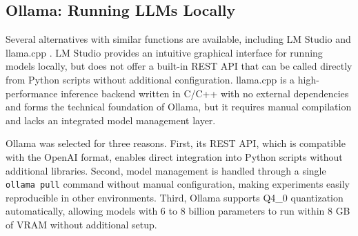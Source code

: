\subsection{Ollama: Running LLMs Locally}
\label{subsec:justifikasi-ollama}

Several alternatives with similar functions are available, including LM Studio \cite{elementlabs2024lmstudio} and llama.cpp \cite{gerganov2023llamacpp}. LM Studio provides an intuitive graphical interface for running models locally, but does not offer a built-in REST API that can be called directly from Python scripts without additional configuration. llama.cpp is a high-performance inference backend written in C/C++ with no external dependencies \cite{gerganov2023llamacpp} and forms the technical foundation of Ollama, but it requires manual compilation and lacks an integrated model management layer.

Ollama was selected for three reasons. First, its REST API, which is compatible with the OpenAI format, enables direct integration into Python scripts without additional libraries. Second, model management is handled through a single \texttt{ollama pull} command without manual configuration, making experiments easily reproducible in other environments. Third, Ollama supports Q4\_0 quantization automatically, allowing models with 6 to 8 billion parameters to run within 8 GB of VRAM without additional setup.